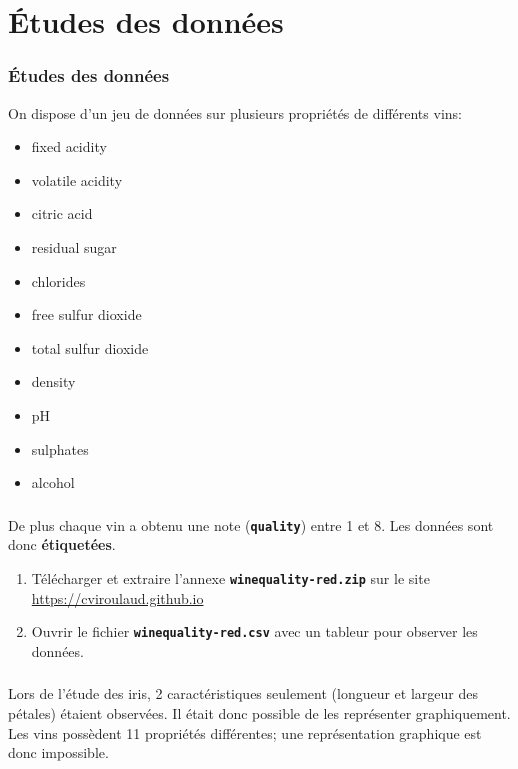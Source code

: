 \documentclass[svgnames,11pt]{beamer}
\begin{document}
\section{Études des données}
\begin{frame}
    \frametitle{Études des données}

    On dispose d'un jeu de données sur plusieurs propriétés de différents vins:
    \begin{itemize}
        \item fixed acidity
        \item volatile acidity 
        \item citric acid
        \item residual sugar
        \item chlorides
        \item free sulfur dioxide
        \item total sulfur dioxide
        \item density
        \item pH
        \item sulphates
        \item alcohol
    \end{itemize}

\end{frame}
\begin{frame}
    \frametitle{}

    \begin{aretenir}[Observation]
        De plus chaque vin a obtenu une note (\textbf{\texttt{quality}}) entre 1 et 8. Les données sont donc \textbf{étiquetées}.
    \end{aretenir}
\begin{activite}
\begin{enumerate}
    \item Télécharger et extraire l'annexe \textbf{\texttt{winequality-red.zip}} sur le site \url{https://cviroulaud.github.io}
    \item Ouvrir le fichier \textbf{\texttt{winequality-red.csv}} avec un tableur pour observer les données.
\end{enumerate}
\end{activite}
\end{frame}
\begin{frame}
    \frametitle{}

    \begin{aretenir}[Observation]
        Lors de l'étude des iris, 2 caractéristiques seulement (longueur et largeur des pétales) étaient observées. Il était donc possible de les représenter graphiquement.\\
        Les vins possèdent 11 propriétés différentes; une représentation graphique est donc impossible.
    \end{aretenir}

\end{frame}
\end{document}

